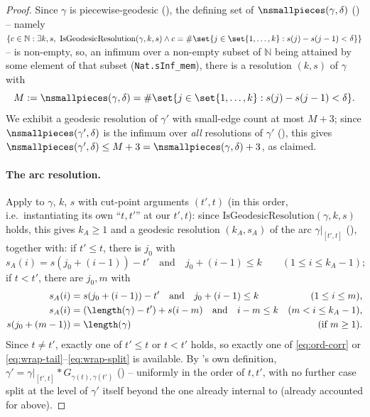 \begin{proof}
  Since $\gamma$ is piecewise-geodesic (), the defining set of
  $\nsmallpieces(\gamma,\delta)$ () -- namely $\{c\in\mathbb{N} : \exists
  k,s,\ \mathrm{IsGeodesicResolution}(\gamma,k,s) \wedge c = \#\set{j\in\set{1,\dots,k} :
  s(j)-s(j-1)<\delta}\}$ -- is non-empty, so, an infimum over a non-empty subset of $\mathbb{N}$
  being attained by some element of that subset (\texttt{Nat.sInf\_mem}), there is a resolution
  $(k,s)$ of $\gamma$ with
  \[
    M := \nsmallpieces(\gamma,\delta) = \#\set{j\in\set{1,\dots,k} : s(j)-s(j-1)<\delta}
    .
  \]
  We exhibit a geodesic resolution of $\gamma'$ with small-edge count at most $M+3$; since
  $\nsmallpieces(\gamma',\delta)$ is the infimum over \emph{all} resolutions of $\gamma'$
  (), this gives $\nsmallpieces(\gamma',\delta) \le M+3 =
  \nsmallpieces(\gamma,\delta)+3$, as claimed.

  \paragraph{The arc resolution.} Apply  to $\gamma$, $k$, $s$ with
  cut-point arguments $(t',t)$ (in this order, i.e.\ instantiating its own ``$t,t'$'' at our
  $t',t$): since $\mathrm{IsGeodesicResolution}(\gamma,k,s)$ holds, this gives $k_A\ge1$ and a
  geodesic resolution $(k_A,s_A)$ of the arc $\gamma|_{[t',t]}$ (), together with:
  if $t'\le t$, there is $j_0$ with
  \begin{equation}
    \label{eq:ord-corr}
    s_A(i) = s(j_0+(i-1))-t' \quad\text{and}\quad j_0+(i-1)\le k \qquad (1\le i\le k_A-1)
    ;
  \end{equation}
  if $t<t'$, there are $j_0,m$ with
  \begin{align}
    \label{eq:wrap-tail}
    s_A(i) &= s(j_0+(i-1))-t' \quad\text{and}\quad j_0+(i-1)\le k & (1\le i\le m)
    ,
    \\
    \label{eq:wrap-head}
    s_A(i) &= (\length(\gamma)-t')+s(i-m) \quad\text{and}\quad i-m\le k & (m<i\le k_A-1)
    ,
    \\
    \label{eq:wrap-split}
    s(j_0+(m-1)) &= \length(\gamma) & (\text{if } m\ge1)
    .
  \end{align}
  Since $t\ne t'$, exactly one of $t'\le t$ or $t<t'$ holds, so exactly one of \eqref{eq:ord-corr}
  or \eqref{eq:wrap-tail}--\eqref{eq:wrap-split} is available. By 's own
  definition, $\gamma' = \gamma|_{[t',t]} * G_{\gamma(t),\gamma(t')}$ () --
  uniformly in the order of $t,t'$, with no further case split at the level of $\gamma'$ itself
  beyond the one already internal to  (already accounted for above).


\end{proof}
